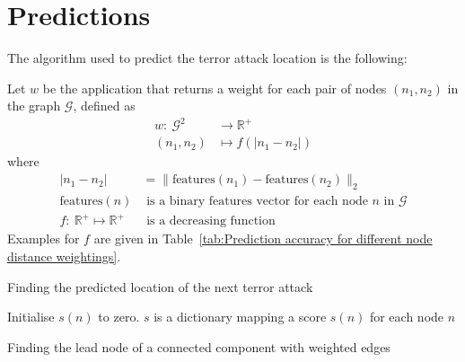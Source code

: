 \section{Predictions}
\label{sec:Predictions}

The algorithm used to predict the terror attack location is the following:

Let $w$ be the application that returns a weight for each pair of nodes $(n_1,n_2)$ in the graph $\mathcal{G}$, defined as
\begin{align}
w:~ \mathcal{G}^2	& \to \mathbb{R}^+ \\
(n_1,n_2) 			& \mapsto f(|n_1-n_2|)
\end{align}
where
\begin{align}
|n_1-n_2| 				& = \| \text{features}(n_1)-\text{features}(n_2)\|_2 \\
\text{features}(n)		& \text{ is a binary features vector for each node }n\text{ in }\mathcal{G} \\
f:~	 \mathbb{R}^+ \mapsto  \mathbb{R}^+ 		&\text{ is a decreasing function}
\end{align}
Examples for $f$ are given in Table~\ref{tab:Prediction accuracy for different node distance weightings}.

\begin{algorithm}[H]
 
 \caption{Finding the predicted location of the next terror attack}
\end{algorithm}


\begin{algorithm}[H]
 
 
 Initialise $s(n)$ to zero. $s$ is a dictionary mapping a score $s(n)$ for each node $n$
 
 \caption{Finding the lead node of a connected component with weighted edges}
\end{algorithm}


